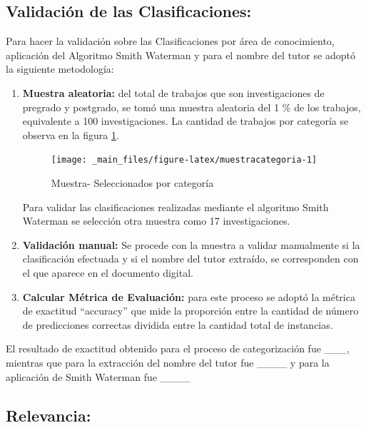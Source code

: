 \documentclass[
  12pt,
  openany]{book}
\begin{document}
\hypertarget{validaciuxf3n-de-las-clasificaciones}{%
\subsection{Validación de las Clasificaciones:}\label{validaciuxf3n-de-las-clasificaciones}}

Para hacer la validación sobre las Clasificaciones por área de conocimiento, aplicación del Algoritmo Smith Waterman y para el nombre del tutor se adoptó la siguiente metodología:

\begin{enumerate}
\def\labelenumi{\arabic{enumi}.}
\item
  \textbf{Muestra aleatoria:} del total de trabajos que son investigaciones de pregrado y postgrado, se tomó una muestra aleatoria del 1 \% de los trabajos, equivalente a 100 investigaciones. La cantidad de trabajos por categoría se observa en la figura \ref{fig:muestracategoria}.

  \begin{figure}

  {\centering \texttt{[image: \_main\_files/figure-latex/muestracategoria-1]} 

  }

  \caption{Muestra- Seleccionados por categoría}\label{fig:muestracategoria}
  \end{figure}

  Para validar las clasificaciones realizadas mediante el algoritmo Smith Waterman se selección otra muestra como 17 investigaciones.
\item
  \textbf{Validación manual:} Se procede con la muestra a validar manualmente si la clasificación efectuada y si el nombre del tutor extraído, se corresponden con el que aparece en el documento digital.
\item
  \textbf{Calcular Métrica de Evaluación:} para este proceso se adoptó la métrica de exactitud ``accuracy'' que mide la proporción entre la cantidad de número de predicciones correctas dividida entre la cantidad total de instancias.
\end{enumerate}

El resultado de exactitud obtenido para el proceso de categorización fue \_\_\_, mientras que para la extracción del nombre del tutor fue \_\_\_\_ y para la aplicación de Smith Waterman fue \_\_\_\_

\hypertarget{pruebas3}{%
\subsection{Relevancia:}\label{pruebas3}}
\end{document}
